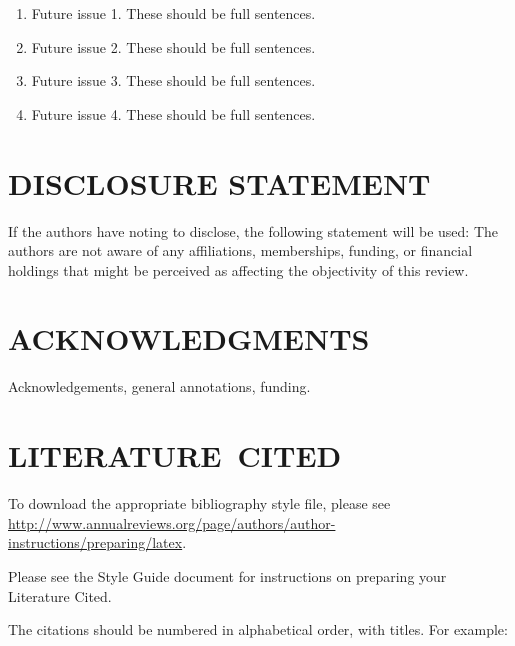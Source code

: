 \documentclass{style/ar-1col}
\begin{document}
\begin{issues}
\begin{enumerate}
\item Future issue 1. These should be full sentences.
\item Future issue 2. These should be full sentences.
\item Future issue 3. These should be full sentences.
\item Future issue 4. These should be full sentences.
\end{enumerate}
\end{issues}

\section*{DISCLOSURE STATEMENT}
If the authors have noting to disclose, the following statement will be used: The authors are not aware of any affiliations, memberships, funding, or financial holdings that
might be perceived as affecting the objectivity of this review. 

\section*{ACKNOWLEDGMENTS}
Acknowledgements, general annotations, funding.

%
\section*{LITERATURE\ CITED}

To download the appropriate bibliography style file, please see \url{http://www.annualreviews.org/page/authors/author-instructions/preparing/latex}. 

\noindent
Please see the Style Guide document for instructions on preparing your Literature Cited.

The citations should be numbered in alphabetical order, with titles. For example:
\end{document}
